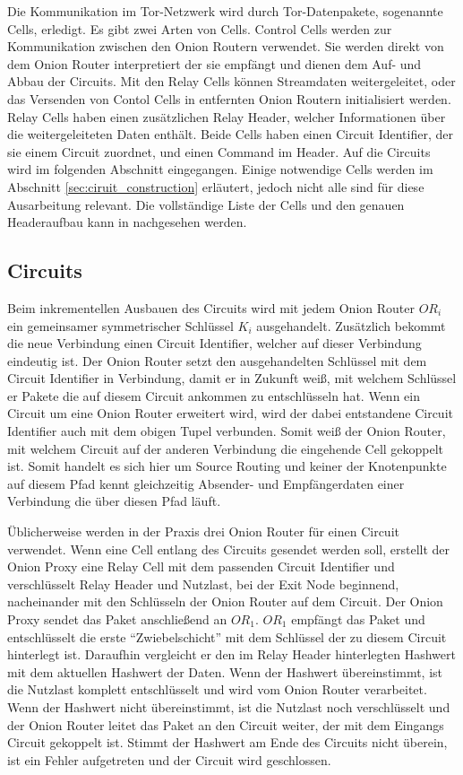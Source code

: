 \documentclass[fleqn,envcountsame,runningheads,10pt,a4paper]{llncs}
\begin{document}
Die Kommunikation im Tor-Netzwerk wird durch Tor-Datenpakete, sogenannte Cells, 
erledigt. Es gibt zwei Arten von Cells. Control Cells werden zur Kommunikation 
zwischen den Onion Routern verwendet. Sie werden direkt von dem Onion Router 
interpretiert der sie empfängt und dienen dem Auf- und Abbau der Circuits. Mit 
den Relay Cells können Streamdaten weitergeleitet, oder das Versenden von Contol 
Cells in entfernten Onion Routern initialisiert werden. Relay Cells haben einen 
zusätzlichen Relay Header, welcher Informationen über die weitergeleiteten Daten 
enthält. Beide Cells haben einen Circuit Identifier, der sie einem Circuit 
zuordnet, und einen Command im Header. Auf die Circuits wird im folgenden 
Abschnitt eingegangen. Einige notwendige Cells werden im Abschnitt 
\ref{sec:ciruit_construction} erläutert, jedoch nicht alle sind für diese 
Ausarbeitung relevant. Die vollständige Liste der Cells und den genauen 
Headeraufbau kann in \cite{tor} nachgesehen werden.

\subsection{Circuits}

Beim inkrementellen Ausbauen des Circuits wird mit jedem Onion Router 
$\textit{OR}_i$ ein gemeinsamer symmetrischer Schlüssel $\textit{K}_i$ 
ausgehandelt. Zusätzlich bekommt die neue Verbindung einen Circuit Identifier, 
welcher auf dieser Verbindung eindeutig ist. Der Onion Router setzt den 
ausgehandelten Schlüssel mit dem Circuit Identifier in Verbindung, damit er in 
Zukunft weiß, mit welchem Schlüssel er Pakete die auf diesem Circuit ankommen zu 
entschlüsseln hat. Wenn ein Circuit um eine Onion Router erweitert wird, wird 
der dabei entstandene Circuit Identifier auch mit dem obigen Tupel 
verbunden. Somit weiß der Onion Router, mit welchem Circuit auf der anderen 
Verbindung die eingehende Cell gekoppelt ist. Somit handelt es sich hier um 
Source Routing und keiner der Knotenpunkte auf diesem Pfad kennt gleichzeitig 
Absender- und Empfängerdaten einer Verbindung die über diesen Pfad läuft. 

Üblicherweise werden in der Praxis drei Onion Router für einen Circuit 
verwendet. Wenn eine Cell entlang des Circuits gesendet werden soll, erstellt 
der Onion Proxy eine Relay Cell mit dem passenden Circuit Identifier und 
verschlüsselt Relay Header und Nutzlast, bei der Exit Node beginnend, 
nacheinander mit den Schlüsseln der Onion Router auf dem Circuit. Der Onion 
Proxy sendet das Paket anschließend an $\textit{OR}_1$. $\textit{OR}_1$ empfängt 
das Paket und entschlüsselt die erste ``Zwiebelschicht'' mit dem Schlüssel der 
zu diesem Circuit hinterlegt ist. Daraufhin vergleicht er den im Relay Header 
hinterlegten Hashwert mit dem aktuellen Hashwert der Daten. Wenn der Hashwert 
übereinstimmt, ist die Nutzlast komplett entschlüsselt und wird vom Onion Router 
verarbeitet. Wenn der Hashwert nicht übereinstimmt, ist die Nutzlast noch 
verschlüsselt und der Onion Router leitet das Paket an den Circuit weiter, der 
mit dem Eingangs Circuit gekoppelt ist. Stimmt der Hashwert am Ende des Circuits 
nicht überein, ist ein Fehler aufgetreten und der Circuit wird geschlossen.
\end{document}
